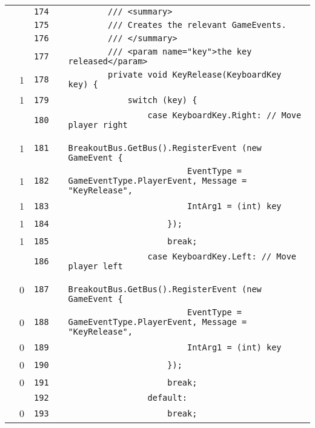 \documentclass[a4paper,landscape,10pt]{article}
\begin{document}
\begin{longtable}[l]{lrrll}
\cellcolor{gray} &  & \verb~174~ & & \verb~        /// <summary>~\\
\cellcolor{gray} &  & \verb~175~ & & \verb~        /// Creates the relevant GameEvents.~\\
\cellcolor{gray} &  & \verb~176~ & & \verb~        /// </summary>~\\
\cellcolor{gray} &  & \verb~177~ & & \verb~        /// <param name="key">the key released</param>~\\
\cellcolor{green} & 1 & \verb~178~ & & \verb~        private void KeyRelease(KeyboardKey key) {~\\
\cellcolor{orange} & 1 & \verb~179~ & & \verb~            switch (key) {~\\
\cellcolor{gray} &  & \verb~180~ & & \verb~                case KeyboardKey.Right: // Move player right~\\
\cellcolor{green} & 1 & \verb~181~ & & \verb~                    BreakoutBus.GetBus().RegisterEvent (new GameEvent {~\\
\cellcolor{green} & 1 & \verb~182~ & & \verb~                        EventType = GameEventType.PlayerEvent, Message = "KeyRelease",~\\
\cellcolor{green} & 1 & \verb~183~ & & \verb~                        IntArg1 = (int) key~\\
\cellcolor{green} & 1 & \verb~184~ & & \verb~                    });~\\
\cellcolor{green} & 1 & \verb~185~ & & \verb~                    break;~\\
\cellcolor{gray} &  & \verb~186~ & & \verb~                case KeyboardKey.Left: // Move player left~\\
\cellcolor{red} & 0 & \verb~187~ & & \verb~                    BreakoutBus.GetBus().RegisterEvent (new GameEvent {~\\
\cellcolor{red} & 0 & \verb~188~ & & \verb~                        EventType = GameEventType.PlayerEvent, Message = "KeyRelease",~\\
\cellcolor{red} & 0 & \verb~189~ & & \verb~                        IntArg1 = (int) key~\\
\cellcolor{red} & 0 & \verb~190~ & & \verb~                    });~\\
\cellcolor{red} & 0 & \verb~191~ & & \verb~                    break;~\\
\cellcolor{gray} &  & \verb~192~ & & \verb~                default:~\\
\cellcolor{red} & 0 & \verb~193~ & & \verb~                    break;~\\

\end{longtable}
\end{document}
